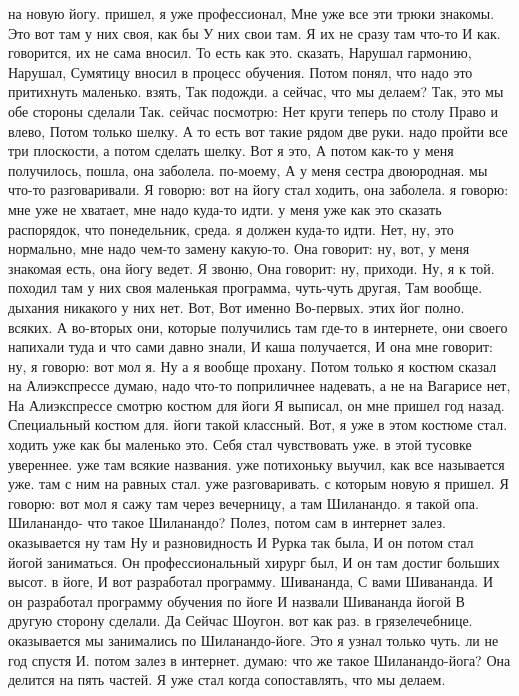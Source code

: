 на новую йогу.
пришел, я уже профессионал, Мне уже все эти трюки знакомы. Это вот там у них своя, как бы У них свои там. Я их не сразу там что-то И как.
говорится, их не сама вносил. То есть как это.
сказать, Нарушал гармонию, Нарушал, Сумятицу вносил в процесс обучения. Потом понял, что надо это притихнуть маленько.
взять, Так подожди. а сейчас, что мы делаем?
Так, это мы обе стороны сделали Так.
сейчас посмотрю: Нет круги теперь по столу Право и влево, Потом только шелку.
А то есть вот такие рядом две руки. надо пройти все три плоскости, а потом сделать шелку.
Вот я это, А потом как-то у меня получилось, пошла, она заболела.
по-моему, А у меня сестра
двоюродная. мы что-то разговаривали. Я говорю: вот на йогу стал ходить, она заболела. я говорю: мне уже не хватает, мне надо куда-то идти. у меня уже как это сказать распорядок, что понедельник, среда.
я должен куда-то идти.
Нет, ну, это нормально, мне надо чем-то замену какую-то. Она говорит: ну, вот, у меня знакомая есть, она йогу ведет. Я звоню, Она говорит: ну, приходи.
Ну, я к той.
походил там у них своя маленькая программа, чуть-чуть другая, Там вообще.
дыхания никакого у них нет.
Вот, Вот именно Во-первых.
этих йог полно.
всяких. А во-вторых они, которые получились там где-то в интернете, они своего напихали туда и что сами давно знали, И каша получается, И она мне говорит: ну, я говорю:
вот мол я.
Ну а я вообще прохану. Потом только я костюм сказал на Алиэкспрессе думаю, надо что-то поприличнее надевать, а не на Вагарисе нет, На Алиэкспрессе смотрю костюм для йоги Я выписал, он мне пришел год назад.
Специальный костюм для.
йоги такой классный. Вот, я уже в этом костюме стал.
ходить уже как бы маленько это.
Себя стал чувствовать уже.
в этой тусовке увереннее. уже там всякие названия.
уже потихоньку выучил, как все называется уже.
там с ним на равных стал.
уже разговаривать. с которым новую я пришел. Я говорю: вот мол я сажу там через вечерницу, а там Шиланандо.
я такой опа.
Шиланандо- что такое Шиланандо? Полез, потом сам в интернет залез.
оказывается ну там Ну и разновидность И Рурка так была, И он потом стал йогой заниматься. Он профессиональный хирург был, И он там достиг больших высот.
в йоге, И вот разработал программу.
Шивананда, С вами Шивананда.
И он разработал программу обучения по йоге И назвали
Шивананда йогой В другую сторону сделали.
Да Сейчас Шоугон.
вот как раз.
в грязелечебнице. оказывается мы занимались по Шиланандо-йоге. Это я узнал только чуть.
ли не год спустя И.
потом залез в интернет. думаю: что же такое Шиланандо-йога?
Она делится на пять частей.
Я уже стал когда сопоставлять, что мы делаем.
